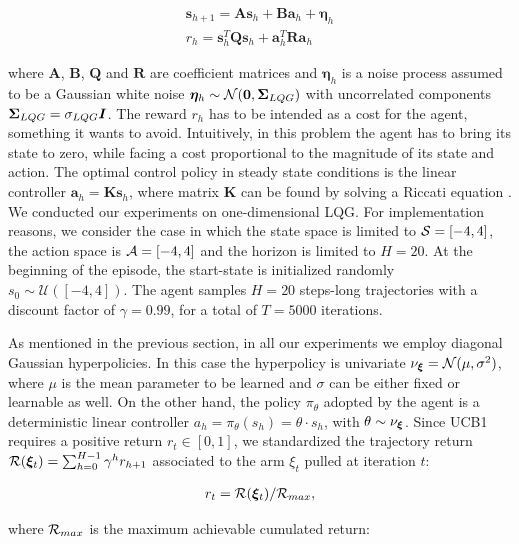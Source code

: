 \begin{align}
\boldsymbol{s}_{h+1}=\boldsymbol{A}\boldsymbol{s}_h+\boldsymbol{B}\boldsymbol{a}_h +\boldsymbol{\eta}_h\\
r_h=\boldsymbol{s}_{h}^T\boldsymbol{Q}\boldsymbol{s}_{h}+\boldsymbol{a}_{h}^T\boldsymbol{R}\boldsymbol{a}_{h}
\end{align}

where $\boldsymbol{A}$, $\boldsymbol{B}$, $\boldsymbol{Q}$ and $\boldsymbol{R}$ are coefficient matrices and $\boldsymbol{\eta}_h$ is a noise process assumed to be a Gaussian white noise $\boldsymbol{\eta}_h\sim\mathcal{N}(\boldsymbol{0}, \boldsymbol{\Sigma}_{LQG})$ with uncorrelated components $\boldsymbol{\Sigma}_{LQG}=\sigma_{LQG}\boldsymbol{I}$. The reward $r_h$ has to be intended as a cost for the agent, something it wants to avoid.
Intuitively, in this problem the agent has to bring its state to zero, while facing a cost proportional to the magnitude of its state and action. The optimal control policy in steady state conditions is the linear controller $\boldsymbol{a}_{h}=\boldsymbol{K}\boldsymbol{s}_{h}$, where matrix $\boldsymbol{K}$ can be found by solving a Riccati equation \cite{dorato1995linear}. We conducted our experiments on one-dimensional \gls{LQG}. 
For implementation reasons, we consider the case in which the state space is limited to $\mathcal{S}=[-4,4]$, the action space is $\mathcal{A}=[-4,4]$ and the horizon is limited to $H=20$. At the beginning of the episode, the start-state is initialized randomly $s_0\sim\mathcal{U}([-4,4])$. The agent samples $H=20$ steps-long trajectories with a discount factor of $\gamma=0.99$, for a total of $T=5000$ iterations.

As mentioned in the previous section, in all our experiments we employ diagonal Gaussian hyperpolicies. In this case the hyperpolicy is univariate $\nu_{\boldsymbol{\xi}} = \mathcal{N}(\mu, \sigma^2)$, where $\mu$ is the mean parameter to be learned and $\sigma$ can be either fixed or learnable as well. On the other hand, the policy $\pi_{\theta}$ adopted by the agent is a deterministic linear controller $a_h=\pi_{\theta}(s_h)=\theta\cdot s_h$, with $\theta\sim\nu_{\boldsymbol{\xi}}$. Since \gls{UCB}1 requires a positive return $r_t\in[0,1]$, we standardized the trajectory return $\mathcal{R}(\boldsymbol{\xi}_t)=\sum_{h=0}^{H-1}\gamma^h r_{h+1}$ associated to the arm $\xi_t$ pulled at iteration $t$: 

\begin{align}
r_t=\mathcal{R}(\boldsymbol{\xi}_t)/\mathcal{R}_{max},
\end{align}

where $\mathcal{R}_{max}$ is the maximum achievable cumulated return:

